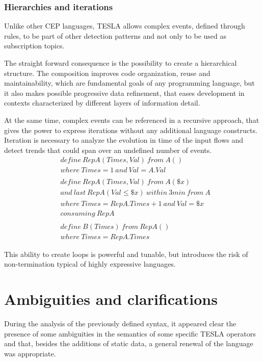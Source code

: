 \subsubsection{Hierarchies and iterations}
Unlike other CEP languages, TESLA allows complex events, defined through rules, to be part of other detection patterns and not only to be used as subscription topics.

The straight forward consequence is the possibility to create a hierarchical structure. The composition improves code organization, reuse and maintainability, which are fundamental goals of any programming language, but it also makes possible progressive data refinement, that eases development in contexts characterized by different layers of information detail.

At the same time, complex events can be referenced in a recursive approach, that gives the power to express iterations without any additional language constructs. Iteration is necessary to analyze the evolution in time of the input flows and detect trends that could span over an undefined number of events.
\begin{align*}
&define\ RepA(Times, Val)\ from\ A()\\
&where\ Times=1\ and\ Val=A.Val\\
\\
&define\ RepA(Times, Val)\ from\ A(\$x)\\
&and\ last\ RepA(Val \le \$x)\ within\ 3 min\ from\ A\\
&where\ Times=RepA.Times+1\ and\ Val = \$x\\
&consuming\ RepA\\\\
&define\ B(Times)\ from\ RepA()\\
&where\ Times=RepA.Times
\end{align*}

This ability to create loops is powerful and tunable, but introduces the risk of non-termination typical of highly expressive languages.

\section{Ambiguities and clarifications}

During the analysis of the previously defined syntax, it appeared clear the presence of some ambiguities in the semantics of some specific TESLA operators and that, besides the additions of static data, a general renewal of the language was appropriate.

